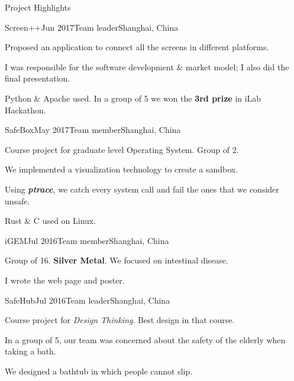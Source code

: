 \documentclass{resume} %
\begin{document}
\begin{rSection}{Project Highlights}

\begin{rSubsection}
  {Screen++}{Jun 2017}{Team leader}{Shanghai, China}
    \item Proposed an application to connect all the screens in different platforms.
    \item I was responsible for the software development \& market model; I also did the final presentation.
    \item Python \& Apache used. In a group of 5 we won the \textbf{3rd prize} in iLab Hackathon.
\end{rSubsection}


\begin{rSubsection}
  {SafeBox}{May 2017}{Team member}{Shanghai, China}
    \item Course project for graduate level Operating System. Group of 2. 
    \item We implemented a visualization technology to create a sandbox.
    \item Using \textit{\textbf{ptrace}}, we catch every system call and fail the ones that we consider unsafe.
    \item Rust \& C used on Linux.
\end{rSubsection}


\begin{rSubsection}
  {iGEM}{Jul 2016}{Team member}{Shanghai, China}
    \item Group of 16. \textbf{Silver Metal}. We focused on intestinal disease.
    \item I wrote the web page and poster.
\end{rSubsection}


\begin{rSubsection}
  {SafeHub}{Jul 2016}{Team leader}{Shanghai, China}
    \item Course project for \textit{Design Thinking}. Best design in that course.
    \item In a group of 5, our team was concerned about the safety of the elderly when taking a bath.
    \item We designed a bathtub in which people cannot slip.
\end{rSubsection}
\end{rSection}
\end{document}
